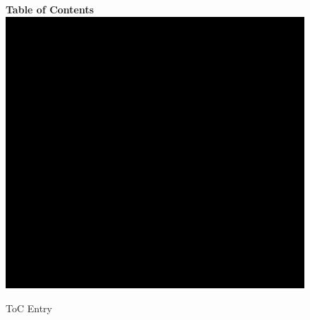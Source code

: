 \documentclass[aps,prl,twocolumn,superscriptaddress,showpacs,amsmath,amssymb]{revtex4-2}
\begin{document}
\begin{figure}
\textbf{Table of Contents}\\
\medskip
  \includegraphics{toc-image}
  \medskip
  \caption*{ToC Entry}
\end{figure}
\end{document}

